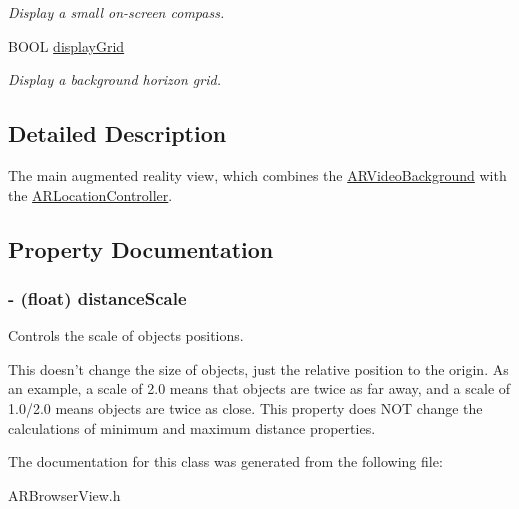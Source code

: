 \begin{DoxyCompactItemize}
\begin{DoxyCompactList}\small\item\em Display a small on-\/screen compass. \end{DoxyCompactList}\item 
\hypertarget{interface_a_r_browser_view_a767b94294f4358686e88d043198b9881}{
BOOL \hyperlink{interface_a_r_browser_view_a767b94294f4358686e88d043198b9881}{displayGrid}}
\label{interface_a_r_browser_view_a767b94294f4358686e88d043198b9881}

\begin{DoxyCompactList}\small\item\em Display a background horizon grid. \end{DoxyCompactList}\end{DoxyCompactItemize}


\subsection{Detailed Description}
The main augmented reality view, which combines the \hyperlink{interface_a_r_video_background}{ARVideoBackground} with the \hyperlink{interface_a_r_location_controller}{ARLocationController}. 

\subsection{Property Documentation}
\hypertarget{interface_a_r_browser_view_a91aef66437e470e8f51b90f5f2ec613c}{
\subsubsection[{distanceScale}]{\setlength{\rightskip}{0pt plus 5cm}-\/ (float) distanceScale}}
\label{interface_a_r_browser_view_a91aef66437e470e8f51b90f5f2ec613c}


Controls the scale of objects positions. 

This doesn't change the size of objects, just the relative position to the origin. As an example, a scale of 2.0 means that objects are twice as far away, and a scale of 1.0/2.0 means objects are twice as close. This property does NOT change the calculations of minimum and maximum distance properties. 

The documentation for this class was generated from the following file:\begin{DoxyCompactItemize}
\item 
ARBrowserView.h\end{DoxyCompactItemize}
